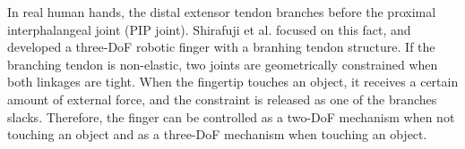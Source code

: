 \documentclass{llncs}
\begin{document}
In real human hands, the distal extensor tendon branches before the proximal interphalangeal joint (PIP joint).
Shirafuji et al. focused on this fact,
and developed a three-DoF robotic finger with a branhing tendon structure\cite{Shirafuji2014b}.
If the branching tendon is non-elastic,
two joints are geometrically constrained when both linkages are tight.
When the fingertip touches an object,
it receives a certain amount of external force, and the constraint is released as one of the branches slacks.
Therefore, the finger can be controlled as a two-DoF mechanism when not touching an object
and as a three-DoF mechanism when touching an object.
\end{document}
